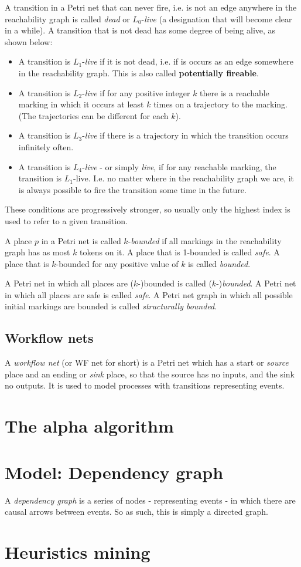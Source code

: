 \documentclass[12pt, a4paper]{article}
\numberwithin{equation}{section}
\begin{document}
A transition in a Petri net that can never fire, i.e. is not an edge anywhere in the reachability graph is called \textit{dead} or $L_0$-\textit{live} (a designation that will become clear in a while). A transition that is not dead has some degree of being alive, as shown below:
\begin{itemize}
\item A transition is $L_1$-\textit{live} if it is not dead, i.e. if is occurs as an edge somewhere in the reachability graph. This is also called \textbf{potentially fireable}.
\item  A transition is $L_2$-\textit{live} if for any positive integer $k$ there is a reachable marking in which it occurs at least $k$ times on a trajectory to the marking. (The trajectories can be different for each $k$).
\item  A transition is $L_3$-\textit{live} if there is a trajectory in which the transition occurs infinitely often.
\item  A transition is $L_4$-\textit{live} - or simply \textit{live}, if for any reachable marking, the transition is $L_1$-live. I.e. no matter where in the reachability graph we are, it is always possible to fire the transition some time in the future.
\end{itemize}
These conditions are progressively stronger, so usually only the highest index is used to refer to a given transition.

A place $p$ in a Petri net is called $k$-\textit{bounded} if all markings in the reachability graph has as most $k$ tokens on it. A place that is 1-bounded is called \textit{safe}. A place that is $k$-bounded for any positive value of $k$ is called \textit{bounded}.

A Petri net in which all places are ($k$-)bounded is called  ($k$-)\textit{bounded}. A Petri net in which all places are safe is called \textit{safe}. A Petri net graph in which all possible initial markings are bounded is called \textit{structurally bounded}.

\subsection{Workflow nets}
A \textit{workflow net} (or WF net for short) is a Petri net which has a start or \textit{source} place and an ending or \textit{sink} place, so that the source has no inputs, and the sink no outputs. It is used to model processes with transitions representing events.

\section{The alpha algorithm}

\section{Model: Dependency graph}
A \textit{dependency graph} is a series of nodes - representing events - in which there are causal arrows between events. So as such, this is simply a directed graph. 

\section{Heuristics mining}
\end{document}
